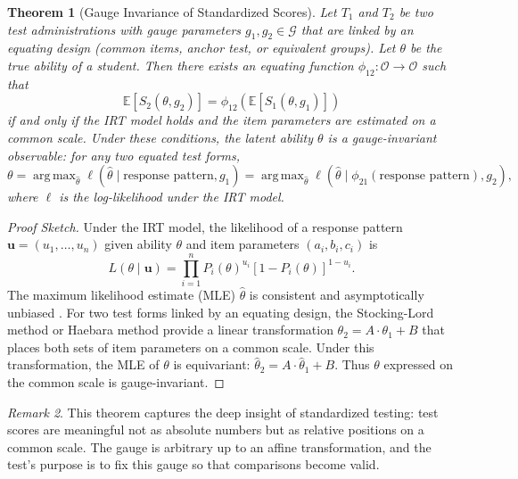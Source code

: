 \documentclass[12pt,a4paper]{article}
\newtheorem{theorem}{Theorem}[section]
\theoremstyle{remark}
\newtheorem{remark}[theorem]{Remark}
\newcommand{\G}{\mathcal{G}}
\newcommand{\Obs}{\mathcal{O}}
\DeclareMathOperator{\argmax}{arg\,max}
\begin{document}
\begin{theorem}[Gauge Invariance of Standardized Scores]
\label{thm:invariance}
Let $T_1$ and $T_2$ be two test administrations with gauge parameters $g_1, g_2 \in \G$ that are linked by an equating design (common items, anchor test, or equivalent groups). Let $\theta$ be the true ability of a student. Then there exists an equating function $\phi_{12}: \Obs \to \Obs$ such that
\begin{equation}
\mathbb{E}[S_2(\theta, g_2)] = \phi_{12}(\mathbb{E}[S_1(\theta, g_1)])
\label{eq:equating}
\end{equation}
if and only if the IRT model holds and the item parameters are estimated on a common scale. Under these conditions, the latent ability $\theta$ is a \emph{gauge-invariant observable}: for any two equated test forms,
\begin{equation}
\theta = \argmax_{\hat{\theta}} \ell(\hat{\theta} \mid \text{response pattern}, g_1) = \argmax_{\hat{\theta}} \ell(\hat{\theta} \mid \phi_{21}(\text{response pattern}), g_2),
\end{equation}
where $\ell$ is the log-likelihood under the IRT model.
\end{theorem}

\begin{proof}[Proof Sketch]
Under the IRT model, the likelihood of a response pattern $\mathbf{u} = (u_1,\dots,u_n)$ given ability $\theta$ and item parameters $(a_i,b_i,c_i)$ is
\begin{equation}
L(\theta \mid \mathbf{u}) = \prod_{i=1}^n P_i(\theta)^{u_i} [1 - P_i(\theta)]^{1-u_i}.
\end{equation}
The maximum likelihood estimate (MLE) $\hat{\theta}$ is consistent and asymptotically unbiased \cite{baker2001}. For two test forms linked by an equating design, the Stocking-Lord method \cite{stocking1983} or Haebara method \cite{haebara1980} provide a linear transformation $\theta_2 = A \cdot \theta_1 + B$ that places both sets of item parameters on a common scale. Under this transformation, the MLE of $\theta$ is equivariant: $\hat{\theta}_2 = A \cdot \hat{\theta}_1 + B$. Thus $\theta$ expressed on the common scale is gauge-invariant.
\end{proof}

\begin{remark}
This theorem captures the deep insight of standardized testing: test scores are meaningful not as absolute numbers but as relative positions on a common scale. The gauge is arbitrary up to an affine transformation, and the test's purpose is to fix this gauge so that comparisons become valid.
\end{remark}
\end{document}
